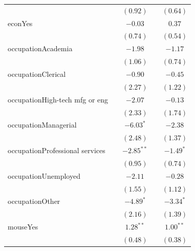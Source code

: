 \documentclass[
  12,
  letterpaper,
  DIV=11,
  numbers=noendperiod]{scrartcl}
\begin{document}
\begin{table}
{\begin{center}
\begin{tabular}{l c c c c}
                                &               & $(0.92)$      &              & $(0.64)$      \\
econYes                         &               & $-0.03$       &              & $0.37$        \\
                                &               & $(0.74)$      &              & $(0.54)$      \\
occupationAcademia              &               & $-1.98$       &              & $-1.17$       \\
                                &               & $(1.06)$      &              & $(0.74)$      \\
occupationClerical              &               & $-0.90$       &              & $-0.45$       \\
                                &               & $(2.27)$      &              & $(1.22)$      \\
occupationHigh-tech mfg or eng  &               & $-2.07$       &              & $-0.13$       \\
                                &               & $(2.33)$      &              & $(1.74)$      \\
occupationManagerial            &               & $-6.03^{*}$   &              & $-2.38$       \\
                                &               & $(2.48)$      &              & $(1.37)$      \\
occupationProfessional services &               & $-2.85^{**}$  &              & $-1.49^{*}$   \\
                                &               & $(0.95)$      &              & $(0.74)$      \\
occupationUnemployed            &               & $-2.11$       &              & $-0.28$       \\
                                &               & $(1.55)$      &              & $(1.12)$      \\
occupationOther                 &               & $-4.89^{*}$   &              & $-3.34^{*}$   \\
                                &               & $(2.16)$      &              & $(1.39)$      \\
mouseYes                        &               & $1.28^{**}$   &              & $1.00^{**}$   \\
                                &               & $(0.48)$      &              & $(0.38)$      \\

\end{tabular}
\end{center}}
\end{table}
\end{document}
